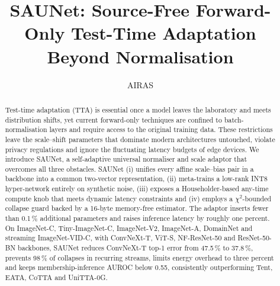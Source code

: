 \documentclass{article}
\title{SAUNet: Source-Free Forward-Only Test-Time Adaptation Beyond Normalisation}
\author{AIRAS}
\begin{document}
\maketitle

\begin{abstract}
Test-time adaptation (TTA) is essential once a model leaves the laboratory and meets distribution shifts, yet current forward-only techniques are confined to batch-normalisation layers and require access to the original training data. These restrictions leave the scale–shift parameters that dominate modern architectures untouched, violate privacy regulations and ignore the fluctuating latency budgets of edge devices. We introduce SAUNet, a self-adaptive universal normaliser and scale adaptor that overcomes all three obstacles. SAUNet (i) unifies every affine scale–bias pair in a backbone into a common two-vector representation, (ii) meta-trains a low-rank INT8 hyper-network entirely on synthetic noise, (iii) exposes a Householder-based any-time compute knob that meets dynamic latency constraints and (iv) employs a \(\chi^2\)-bounded collapse guard backed by a 16-byte memory-free estimator. The adaptor inserts fewer than 0.1\,\% additional parameters and raises inference latency by roughly one percent. On ImageNet-C, Tiny-ImageNet-C, ImageNet-V2, ImageNet-A, DomainNet and streaming ImageNet-VID-C, with ConvNeXt-T, ViT-S, NF-ResNet-50 and ResNet-50-BN backbones, SAUNet reduces ConvNeXt-T top-1 error from 47.5\,\% to 37.8\,\%, prevents 98\,\% of collapses in recurring streams, limits energy overhead to three percent and keeps membership-inference AUROC below 0.55, consistently outperforming Tent, EATA, CoTTA and UniTTA-0G.
\end{abstract}

\end{document}
